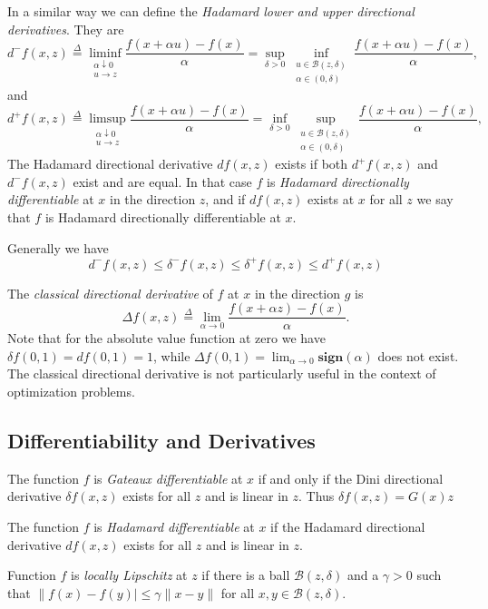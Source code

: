 \documentclass[
  12pt,
]{book}
\begin{document}
In a similar way we can define the \emph{Hadamard lower and upper directional derivatives}. They are
\[
d^-f(x,z)\mathop{=}\limits^{\Delta}\liminf_{\substack{\alpha\downarrow 0\\u\rightarrow z}}\frac{f(x+\alpha u)-f(x)}{\alpha}=
\sup_{\delta>0}\inf_{\substack{u\in\mathcal{B}(z,\delta)\\\alpha\in(0,\delta)}}\frac{f(x+\alpha u)-f(x)}{\alpha},
\]
and
\[
d^+f(x,z)\mathop{=}\limits^{\Delta}\limsup_{\substack{\alpha\downarrow 0\\u\rightarrow z}}\frac{f(x+\alpha u)-f(x)}{\alpha}=
\inf_{\delta>0}\sup_{\substack{u\in\mathcal{B}(z,\delta)\\\alpha\in(0,\delta)}}\frac{f(x+\alpha u)-f(x)}{\alpha},
\]
The Hadamard directional derivative \(df(x,z)\) exists if both \(d^+f(x,z)\) and \(d^-f(x,z)\) exist and are equal. In that case \(f\) is \emph{Hadamard directionally differentiable} at \(x\) in the direction \(z\), and if \(df(x,z)\) exists at \(x\) for all \(z\) we say that \(f\) is Hadamard directionally differentiable at \(x.\)

Generally we have
\[
d^-f(x,z)\leq\delta^-f(x,z)\leq\delta^+f(x,z)\leq d^+f(x,z)
\]

The \emph{classical directional derivative} of \(f\) at \(x\) in the direction \(g\) is
\[
\Delta f(x,z)\mathop{=}\limits^{\Delta}\lim_{\alpha\rightarrow 0}\frac{f(x+\alpha z)-f(x)}{\alpha}.
\]
Note that for the absolute value function at zero we have \(\delta f(0,1)=df(0,1)=1\), while \(\Delta f(0,1)=\lim_{\alpha\rightarrow 0}\mathbf{sign}(\alpha)\) does not exist.
The classical directional derivative is not particularly useful in the context of optimization problems.

\hypertarget{differentiability-and-derivatives}{%
\subsection{Differentiability and Derivatives}\label{differentiability-and-derivatives}}

The function \(f\) is \emph{Gateaux differentiable} at \(x\) if and only if the Dini directional derivative \(\delta f(x,z)\) exists for all \(z\) and is linear in \(z\). Thus \(\delta f(x,z)=G(x)z\)

The function \(f\) is \emph{Hadamard differentiable} at \(x\) if the Hadamard directional derivative \(df(x,z)\) exists for all \(z\) and is linear in \(z\).

Function \(f\) is \emph{locally Lipschitz} at \(z\) if there is a ball \(\mathcal{B}(z,\delta)\) and a \(\gamma>0\) such that \(\|f(x)-f(y)|\leq\gamma\|x-y\|\) for all \(x,y\in\mathcal{B}(z,\delta).\)
\end{document}
